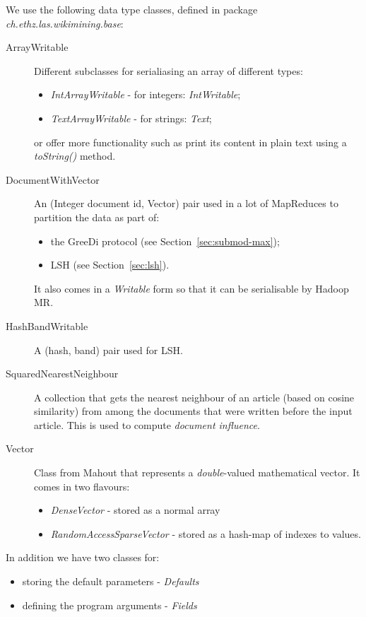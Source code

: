 We use the following data type classes, defined in package
\emph{ch.ethz.las.wikimining.base}:
\begin{description}
  \item[ArrayWritable] Different subclasses for serialiasing an array of
  different types:
    \begin{itemize}
      \item \emph{IntArrayWritable} - for integers: \emph{IntWritable};
      \item \emph{TextArrayWritable} - for strings: \emph{Text};
    \end{itemize}
  or offer more functionality such as print its content in plain text using a
  \emph{toString()} method.
  \item[DocumentWithVector] An (Integer document id, Vector) pair used in a lot
  of MapReduces to partition the data as part of:
    \begin{itemize}
      \item the GreeDi protocol (see Section~\vref{sec:submod-max});
      \item \acl{LSH} (see Section~\vref{sec:lsh}).
    \end{itemize}
    It also comes in a \emph{Writable} form so that it can be serialisable by
    Hadoop \acl{MR}.
  \item[HashBandWritable] A (hash, band) pair used for \ac{LSH}.
  \item[SquaredNearestNeighbour] A collection that gets the nearest neighbour
  of an article (based on cosine similarity) from among the documents that were
  written before the input article. This is used to compute \emph{document
  influence}.
  \item[Vector] Class from Mahout that represents a \emph{double}-valued
  mathematical vector. It comes in two flavours:
  \begin{itemize}
    \item \emph{DenseVector} - stored as a normal array
    \item \emph{RandomAccessSparseVector} - stored as a hash-map of indexes to
    values.
  \end{itemize}
\end{description}

In addition we have two classes for:
\begin{itemize}
  \item storing the default parameters - \emph{Defaults}
  \item defining the program arguments - \emph{Fields}
\end{itemize}

